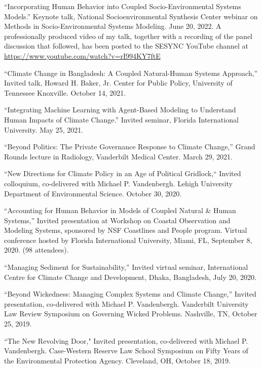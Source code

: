%
%
\item ``Incorporating Human Behavior into Coupled Socio-Environmental Systems
   Models.'' Keynote talk, National Socioenvironmental Synthesis Center
   webinar on Methods in Socio-Environmental Systems Modeling.
   June 20, 2022. A professionally produced video of my talk, together with a
   recording of the panel discussion that followed, has been posted to the
   SESYNC YouTube channel at \url{https://www.youtube.com/watch?v=rI994KY7ftE}
\item ``Climate Change in Bangladesh: A Coupled Natural-Human Systems
   Approach,'' Invited talk, Howard H. Baker, Jr. Center for Public Policy,
   University of Tennessee Knoxville. October 14, 2021.
\item ``Integrating Machine Learning with Agent-Based Modeling to Understand
  Human Impacts of Climate Change.'' Invited seminar, Florida International
  University. May 25, 2021.
\item ``Beyond Politics: The Private Governance Response to Climate
  Change,'' Grand Rounds lecture in Radiology, Vanderbilt Medical Center.
  March 29, 2021.
\item ``New Directions for Climate Policy in an Age of Political Gridlock,``
  Invited colloquium, co-delivered with Michael P. Vandenbergh. Lehigh
  University Department of Environmental Science. October 30, 2020.
\item ``Accounting for Human Behavior in Models of Coupled Natural \& Human
  Systems,'' Invited presentation at Workshop on Coastal Observation and
  Modeling Systems, sponsored by NSF Coastlines and People program. Virtual
  conference hosted by Florida International University, Miami, FL,
  September 8, 2020. (98 attendees).
\item ``Managing Sediment for Sustainability,'' Invited virtual seminar,
  International Centre for Climate Change and Development, Dhaka, Bangladesh,
  July 20, 2020.
\item ``Beyond Wickedness: Managing Complex Systems and Climate Change,''
  Invited presentation, co-delivered with Michael P. Vandenbergh. Vanderbilt
  University Law Review Symposium on Governing Wicked Problems. Nashville, TN,
  October 25, 2019.
\item ``The New Revolving Door," Invited presentation, co-delivered with
  Michael P. Vandenbergh. Case-Western Reserve Law School Symposium on Fifty
  Years of the Environmental Protection Agency. Cleveland, OH, October 18, 2019.
